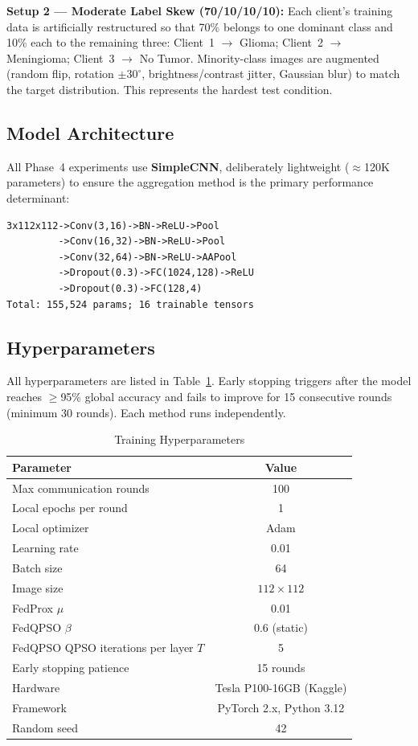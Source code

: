 \documentclass[conference]{IEEEtran}
\begin{document}
\textbf{Setup 2 --- Moderate Label Skew (70/10/10/10):} Each client's
training data is artificially restructured so that 70\% belongs to one
dominant class and 10\% each to the remaining three: Client~1 $\to$ Glioma;
Client~2 $\to$ Meningioma; Client~3 $\to$ No Tumor. Minority-class images are
augmented (random flip, rotation $\pm30^\circ$, brightness/contrast jitter,
Gaussian blur) to match the target distribution. This represents the hardest
test condition.

\subsection{Model Architecture}
All Phase~4 experiments use \textbf{SimpleCNN}, deliberately lightweight
($\approx$120K parameters) to ensure the aggregation method is the primary
performance determinant:

{\small\begin{verbatim}
3x112x112->Conv(3,16)->BN->ReLU->Pool
         ->Conv(16,32)->BN->ReLU->Pool
         ->Conv(32,64)->BN->ReLU->AAPool
         ->Dropout(0.3)->FC(1024,128)->ReLU
         ->Dropout(0.3)->FC(128,4)
Total: 155,524 params; 16 trainable tensors
\end{verbatim}}

\subsection{Hyperparameters}
All hyperparameters are listed in Table~\ref{tab:hyperparams}. Early stopping
triggers after the model reaches $\geq$95\% global accuracy and fails to
improve for 15 consecutive rounds (minimum 30 rounds). Each method runs
independently.

\begin{table}[t]
\caption{Training Hyperparameters}
\label{tab:hyperparams}
\begin{center}
\begin{tabular}{lc}
\hline
\textbf{Parameter} & \textbf{Value}\\
\hline
Max communication rounds & 100\\
Local epochs per round & 1\\
Local optimizer & Adam\\
Learning rate & 0.01\\
Batch size & 64\\
Image size & $112 \times 112$\\
FedProx $\mu$ & 0.01\\
FedQPSO $\beta$ & 0.6 (static)\\
FedQPSO QPSO iterations per layer $T$ & 5\\
Early stopping patience & 15 rounds\\
Hardware & Tesla P100-16GB (Kaggle)\\
Framework & PyTorch 2.x, Python 3.12\\
Random seed & 42\\
\hline
\end{tabular}
\end{center}
\end{table}
\end{document}
